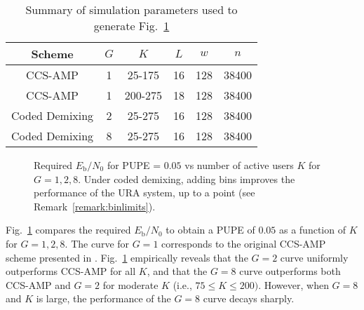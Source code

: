 \documentclass[journal]{IEEEtran}
\begin{document}
\begin{table}[t]
    \centering
    \caption{Summary of simulation parameters used to generate Fig.~\ref{fig:PupevsBins}}
    \label{table:cdresults}
    \begin{tabular}{||c|c|c|c|c|c||}
        \hline
        Scheme & $G$ & $K$ & $L$ & $w$ & $n$ \\
        \hline\hline
         CCS-AMP & 1 & 25-175 & 16 & 128 & 38400  \\
         \hline
         CCS-AMP & 1 & 200-275 & 18 & 128 & 38400 \\ 
         \hline
         Coded Demixing & 2 & 25-275 & 16 & 128 & 38400 \\ 
         \hline
         Coded Demixing & 8 & 25-275 & 16 & 128 & 38400 \\
         \hline
    \end{tabular} 
\end{table}

\begin{figure}[ht]
    \centering
    
    \caption{Required $E_{\mathrm{b}}/N_0$ for PUPE = $0.05$ vs number of active users $K$ for $G = 1, 2, 8$. 
    Under coded demixing, adding bins improves the performance of the URA system, up to a point (see Remark~\ref{remark:binlimits}).}
    \label{fig:PupevsBins}
\end{figure}

Fig.~\ref{fig:PupevsBins} compares the required $E_{\mathrm{b}}/N_0$ to obtain a PUPE of $0.05$ as a function of $K$ for $G = 1, 2, 8$.
The curve for $G = 1$ corresponds to the original CCS-AMP scheme presented in \cite{amalladinne2020unsourced}. 
Fig.~\ref{fig:PupevsBins} empirically reveals that the $G = 2$ curve uniformly outperforms CCS-AMP for all $K$, and that the $G = 8$ curve outperforms both CCS-AMP and $G = 2$ for moderate $K$ (i.e., $75 \leq K \leq 200)$.
However, when $G = 8$ and $K$ is large, the performance of the $G = 8$ curve decays sharply. 
\end{document}
